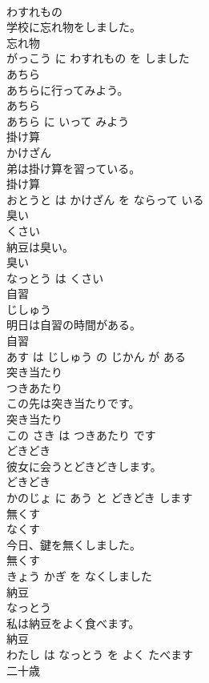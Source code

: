 \documentclass[8pt]{extreport}
\begin{document}
\begin{CJK}{UTF8}{min}
\\	わすれもの			
\\	学校に忘れ物をしました。	
\\	忘れ物 
\\	がっこう に わすれもの を しました			
\\	あちら	
\\	あちらに行ってみよう。	
\\	あちら 
\\	あちら に いって みよう			
\\	掛け算	
\\	かけざん			
\\	弟は掛け算を習っている。	
\\	掛け算 
\\	おとうと は かけざん を ならって いる			
\\	臭い	
\\	くさい			
\\	納豆は臭い。	
\\	臭い 
\\	なっとう は くさい			
\\	自習	
\\	じしゅう			
\\	明日は自習の時間がある。	
\\	自習 
\\	あす は じしゅう の じかん が ある			
\\	突き当たり	
\\	つきあたり			
\\	この先は突き当たりです。	
\\	突き当たり 
\\	この さき は つきあたり です			
\\	どきどき	
\\	彼女に会うとどきどきします。	
\\	どきどき 
\\	かのじょ に あう と どきどき します			
\\	無くす	
\\	なくす			
\\	今日、鍵を無くしました。	
\\	無くす 
\\	きょう かぎ を なくしました			
\\	納豆	
\\	なっとう			
\\	私は納豆をよく食べます。	
\\	納豆 
\\	わたし は なっとう を よく たべます			
\\	二十歳	

\end{CJK}
\end{document}
